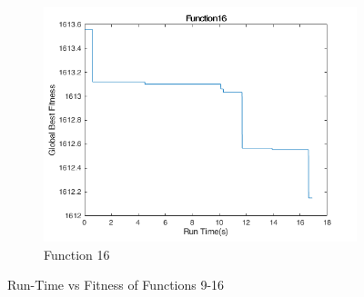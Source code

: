 \begin{figure}
\begin{subfigure}[b]{0.4\textwidth}
    \includegraphics[width=\textwidth]{img/cecrt/f16}
    \caption{Function 16}
  \end{subfigure}
  \caption{Run-Time vs Fitness of Functions 9-16}
\end{figure}

\clearpage

